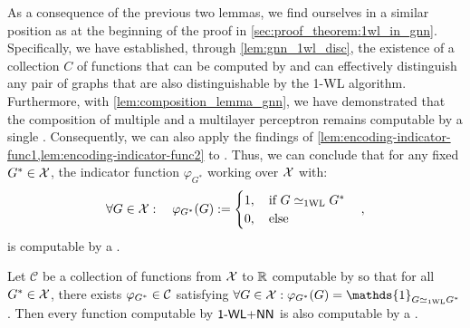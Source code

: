 As a consequence of the previous two lemmas, we find ourselves in a similar position as at the beginning of the proof in \cref{sec:proof_theorem:1wl_in_gnn}. Specifically, we have established, through \cref{lem:gnn_1wl_disc}, the existence of a collection $C$ of functions that can be computed by \gnns and can effectively distinguish any pair of graphs that are also distinguishable by the 1-WL algorithm. Furthermore, with \cref{lem:composition_lemma_gnn}, we have demonstrated that the composition of multiple \gnns and a multilayer perceptron remains computable by a single \gnn. Consequently, we can also apply the findings of \cref{lem:encoding-indicator-func1,lem:encoding-indicator-func2} to \gnns. Thus, we can conclude that for any fixed $G^* \in \mathcal{X}$, the indicator function $\varphi_{G^*}$ working over $\mathcal{X}$ with:
\begin{align*}
        \forall G \in \mathcal{X}: \quad \varphi_{G^*}(G) := 
        \begin{cases}
            1, \quad \text{if $G \simeq_{\text{1WL}} G^*$}\\
            0, \quad \text{else}
        \end{cases},
\end{align*}
is computable by a \gnn.

\begin{lemma}\label{lem:decompose_wl_as_gnn}
    Let $\mathcal{C}$ be a collection of functions from $\mathcal{X}$ to $\mathbb{R}$ computable by \gnns so that for all $G^* \in \mathcal{X}$, there exists 
    $\varphi_{G^*} \in \mathcal{C}$ satisfying $\forall G \in \cX: \varphi_{G^*}(G) = \mathds{1}_{G \wliso G^*}$. Then every function computable by $\textsf{1-WL+NN}$ is also computable by a \gnn.
\end{lemma}

